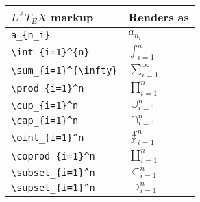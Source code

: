 \documentclass{article}
\begin{document}
 
 \begin{tabular}{l l}
 \hline
 $L^{A}T_{E}X $ markup & Renders as \\
 \hline
 
 \verb|a_{n_i}| & $a_{n_i}$\\[0.5em]
 
 \verb|\int_{i=1}^{n}| & $\int_{i=1}^{n}$  \\[0.5em]
 
 \verb|\sum_{i=1}^{\infty}| & $\sum_{i=1}^{\infty}$  \\[0.5em]
 
 \verb|\prod_{i=1}^n| & $\prod_{i=1}^n$  \\[0.5em]
 
 \verb|\cup_{i=1}^n| & $\cup_{i=1}^n$  \\[0.5em]
 \verb|\cap_{i=1}^n| & $\cap_{i=1}^n$  \\[0.5em]
 \verb|\oint_{i=1}^n| & $\oint_{i=1}^n$  \\[0.5em]
 \verb|\coprod_{i=1}^n| & $\coprod_{i=1}^n$  \\[0.5em]
  \verb|\subset_{i=1}^n| & $\subset_{i=1}^n$  \\[0.5em]
 \verb|\supset_{i=1}^n| & $\supset_{i=1}^n$  \\[0.5em]

 
 \end{tabular}   
  
  
\end{document}
